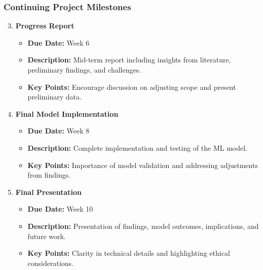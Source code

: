\documentclass[aspectratio=169]{beamer}
\begin{document}
\begin{frame}[fragile]
    \frametitle{Continuing Project Milestones}
    \begin{enumerate}
        \setcounter{enumi}{2} %
        \item \textbf{Progress Report} 
            \begin{itemize}
                \item \textbf{Due Date:} Week 6
                \item \textbf{Description:} Mid-term report including insights from literature, preliminary findings, and challenges.
                \item \textbf{Key Points:} Encourage discussion on adjusting scope and present preliminary data.
            \end{itemize}
        
        \item \textbf{Final Model Implementation} 
            \begin{itemize}
                \item \textbf{Due Date:} Week 8
                \item \textbf{Description:} Complete implementation and testing of the ML model.
                \item \textbf{Key Points:} Importance of model validation and addressing adjustments from findings.
            \end{itemize}

        \item \textbf{Final Presentation} 
            \begin{itemize}
                \item \textbf{Due Date:} Week 10
                \item \textbf{Description:} Presentation of findings, model outcomes, implications, and future work.
                \item \textbf{Key Points:} Clarity in technical details and highlighting ethical considerations.
            \end{itemize}
    \end{enumerate}
\end{frame}
\end{document}
